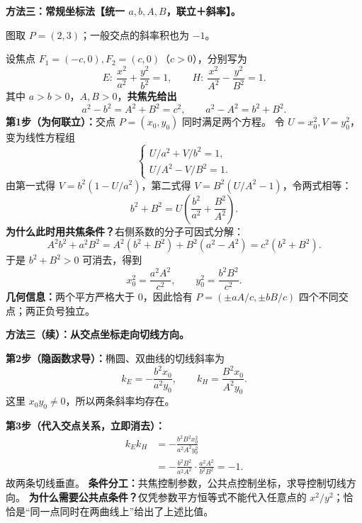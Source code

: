 \clearpage
\begin{proofbox}
\textbf{方法三：常规坐标法【统一 $a,b,A,B$，联立＋斜率】。}

\begin{center}


{\small 图取 $P=(2,3)$；一般交点的斜率积也为 $-1$。}
\end{center}


设焦点 $F_1=(-c,0),F_2=(c,0)$（$c>0$），分别写为
\[
 E:\ \frac{x^2}{a^2}+\frac{y^2}{b^2}=1,\qquad
 H:\ \frac{x^2}{A^2}-\frac{y^2}{B^2}=1.
\]
其中 $a>b>0$，$A,B>0$，\textbf{共焦先给出}
\[
\boxed{a^2-b^2=A^2+B^2=c^2},\qquad
\boxed{a^2-A^2=b^2+B^2}.
\]
\textbf{第1步（为何联立）：}交点 $P=(x_0,y_0)$ 同时满足两个方程。
令 $U=x_0^2,V=y_0^2$，变为线性方程组
\[
\begin{cases}
 U/a^2+V/b^2=1,\\
 U/A^2-V/B^2=1.
\end{cases}
\]
由第一式得 $V=b^2(1-U/a^2)$，第二式得
$V=B^2(U/A^2-1)$，令两式相等：
\[
 b^2+B^2=U\left(\frac{b^2}{a^2}+\frac{B^2}{A^2}\right).
\]
\textbf{为什么此时用共焦条件？}右侧系数的分子可因式分解：
\[
 A^2b^2+a^2B^2
 =A^2(b^2+B^2)+B^2(a^2-A^2)
 =c^2(b^2+B^2).
\]
于是 $b^2+B^2>0$ 可消去，得到
\[
\boxed{x_0^2=\frac{a^2A^2}{c^2}},\qquad
\boxed{y_0^2=\frac{b^2B^2}{c^2}}.
\]
\textbf{几何信息：}两个平方严格大于 $0$，因此恰有
$P=(\pm aA/c,\pm bB/c)$ 四个不同交点；两正负号独立。

\end{proofbox}
\clearpage
\begin{proofbox}
\textbf{方法三（续）：从交点坐标走向切线方向。}

\textbf{第2步（隐函数求导）：}椭圆、双曲线的切线斜率为
\[
\boxed{k_E=-\frac{b^2x_0}{a^2y_0}},\qquad
\boxed{k_H=\frac{B^2x_0}{A^2y_0}}.
\]
这里 $x_0y_0\ne0$，所以两条斜率均存在。

\textbf{第3步（代入交点关系，立即消去）：}
\[
\begin{aligned}
 k_Ek_H
 &=-\frac{b^2B^2x_0^2}{a^2A^2y_0^2}\\
 &=-\frac{b^2B^2}{a^2A^2}\cdot
 \frac{a^2A^2}{b^2B^2}=\boxed{-1}.
\end{aligned}
\]
故两条切线垂直。
\textbf{条件分工：}共焦控制参数，公共点控制坐标，求导控制切线方向。
\textbf{为什么需要公共点条件？}仅凭参数平方恒等式不能代入任意点的
$x^2/y^2$；恰恰是“同一点同时在两曲线上”给出了上述比值。
\end{proofbox}

